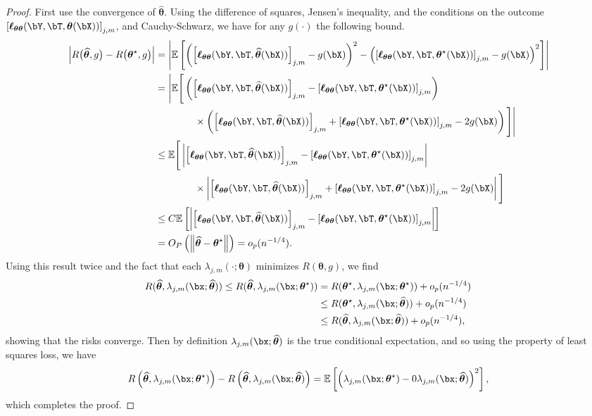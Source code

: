 \documentclass[12pt]{article}
\numberwithin{equation}{section}
\theoremstyle{definition}
\newcommand{\E}{\mathbb{E}}
\newcommand{\btheta}{\boldsymbol{\theta}}
\newcommand{\bttrue}{\btheta^\star}
\newcommand{\bthat}{\bm{\widehat{\theta}}}
\begin{document}
\begin{appendices}
\begin{proof}
	First use the convergence of $\bthat$. Using the difference of squares, Jensen's inequality, and the conditions on the outcome $\left[\bm{\ell}_{\btheta\btheta}(\bY, \bT, \btheta(\bX))\right]_{j,m}$, and Cauchy-Schwarz, we have for any $g(\cdot)$ the following bound.
	\begin{align*}
		\left| R\big(\bthat, g \big) - R\big(\bttrue,  g \big) \right|  & =  \left| \E \left[ \left( \left[\bm{\ell}_{\btheta\btheta}(\bY,\bT, \bthat(\bX))\right]_{j,m}  -  g(\bX)\right)^2 - \left( \left[\bm{\ell}_{\btheta\btheta}(\bY,\bT, \bttrue(\bX))\right]_{j,m}  -  g(\bX)\right)^2  \right] \right| 		 \\
		& = \Bigg| \E \Bigg[ \left( \left[\bm{\ell}_{\btheta\btheta}(\bY,\bT, \bthat(\bX))\right]_{j,m}  - \left[\bm{\ell}_{\btheta\btheta}(\bY,\bT, \bttrue(\bX))\right]_{j,m} \right)   		 \\
		& \qquad \qquad \times \left( \left[\bm{\ell}_{\btheta\btheta}(\bY,\bT, \bthat(\bX))\right]_{j,m}  +  \left[\bm{\ell}_{\btheta\btheta}(\bY,\bT, \bttrue(\bX))\right]_{j,m} - 2 g(\bX) \right)\Bigg] \Bigg|    		 \\
		& \leq  \E \Bigg[ \left| \left[\bm{\ell}_{\btheta\btheta}(\bY,\bT, \bthat(\bX))\right]_{j,m}  - \left[\bm{\ell}_{\btheta\btheta}(\bY,\bT, \bttrue(\bX))\right]_{j,m} \right|   		 \\
		& \qquad \qquad \times \left| \left[\bm{\ell}_{\btheta\btheta}(\bY,\bT, \bthat(\bX))\right]_{j,m}  +  \left[\bm{\ell}_{\btheta\btheta}(\bY,\bT, \bttrue(\bX))\right]_{j,m} - 2 g(\bX) \right| \Bigg]  		 \\
		& \leq C \E \left[ \left| \left[\bm{\ell}_{\btheta\btheta}(\bY,\bT, \bthat(\bX))\right]_{j,m}  - \left[\bm{\ell}_{\btheta\btheta}(\bY,\bT, \bttrue(\bX))\right]_{j,m} \right| \right]  		 \\
		& = O_P\left( \left\| \bthat - \bttrue\right\| \right) = o_p(n^{-1/4}).  
	\end{align*}
	Using this result twice and the fact that each $\lambda_{j,m}(\cdot; \btheta)$ minimizes $R(\btheta, g)$, we find 
	\begin{align*}
		R(\bthat, \lambda_{j,m}(\bx; \bthat)) \leq R(\bthat, \lambda_{j,m}(\bx; \bttrue)) & = R(\bttrue, \lambda_{j,m}(\bx; \bttrue))  + o_p(n^{-1/4})  		\\
		& \leq R(\bttrue, \lambda_{j,m}(\bx; \bthat))  + o_p(n^{-1/4})  		\\
		& \leq R(\bthat, \lambda_{j,m}(\bx; \bthat))  + o_p(n^{-1/4}),
	\end{align*}
	showing that the risks converge. Then by definition $\lambda_{j,m}(\bx; \bthat)$ is the true conditional expectation, and so using the property of least squares loss, we have
	\[
		R\left(\bthat, \lambda_{j,m}(\bx; \bttrue) \right) - R\left(\bthat, \lambda_{j,m}(\bx; \bthat) \right) = \E\left[ \left(\lambda_{j,m}(\bx; \bttrue) -0 \lambda_{j,m}(\bx; \bthat) \right)^2 \right],
	\]
	which completes the proof.
\end{proof}










\end{appendices}
\end{document}
